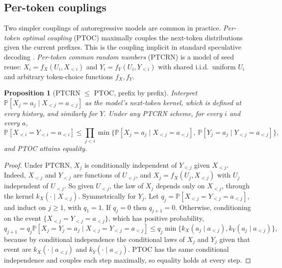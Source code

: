 \documentclass[11pt]{article}
\newtheorem{proposition}[theorem]{Proposition}
\theoremstyle{definition}
\renewcommand{\Pr}{\mathbb{P}}
\begin{document}
\subsection{Per-token couplings}

Two simpler couplings of autoregressive models are common in practice.
\emph{Per-token optimal coupling} (PTOC) maximally couples the next-token
distributions given the current prefixes. This is the coupling implicit in
standard speculative decoding \cite{leviathan2023fast,chen2023accelerating}.
\emph{Per-token common random numbers} (PTCRN) is a model of seed reuse:
$X_i=f_X(U_i,X_{<i})$ and $Y_i=f_Y(U_i,Y_{<i})$ with shared i.i.d.\ uniform
$U_i$ and arbitrary token-choice functions $f_X,f_Y$.

\begin{proposition}[PTCRN $\le$ PTOC, prefix by prefix]\label{prop:ptcrn}
Interpret $\Pr[X_j=a_j\mid X_{<j}=a_{<j}]$ as the model's next-token kernel,
which is defined at every history, and similarly for $Y$. Under any PTCRN scheme,
for every $i$ and every $a$,
\[
  \Pr[X_{<i}=Y_{<i}=a_{<i}]\le\prod_{j<i}\min\bigl\{\Pr[X_j=a_j\mid X_{<j}=a_{<j}],\ \Pr[Y_j=a_j\mid Y_{<j}=a_{<j}]\bigr\},
\]
and PTOC attains equality.
\end{proposition}
\begin{proof}
Under PTCRN, $X_j$ is conditionally independent of $Y_{<j}$ given $X_{<j}$.
Indeed, $X_{<j}$ and $Y_{<j}$ are functions of $U_{<j}$, and $X_j=f_X(U_j,X_{<j})$
with $U_j$ independent of $U_{<j}$. So given $U_{<j}$, the law of $X_j$ depends
only on $X_{<j}$, through the kernel $k_X(\cdot\mid X_{<j})$. Symmetrically
for $Y_j$. Let $q_j=\Pr[X_{<j}=Y_{<j}=a_{<j}]$, and induct on $j\ge1$, with $q_1=1$.
If $q_j=0$ then $q_{j+1}=0$. Otherwise, conditioning on the event
$\{X_{<j}=Y_{<j}=a_{<j}\}$, which has positive probability,
\[
q_{j+1}=q_j\Pr[X_j=Y_j=a_j\mid X_{<j}=Y_{<j}=a_{<j}]\le q_j\min\{k_X(a_j\mid a_{<j}),k_Y(a_j\mid a_{<j})\},
\]
because by conditional independence the conditional laws of $X_j$ and $Y_j$
given that event are $k_X(\cdot\mid a_{<j})$ and $k_Y(\cdot\mid a_{<j})$. PTOC
has the same conditional independence and couples each step maximally, so
equality holds at every step.
\end{proof}
\end{document}
